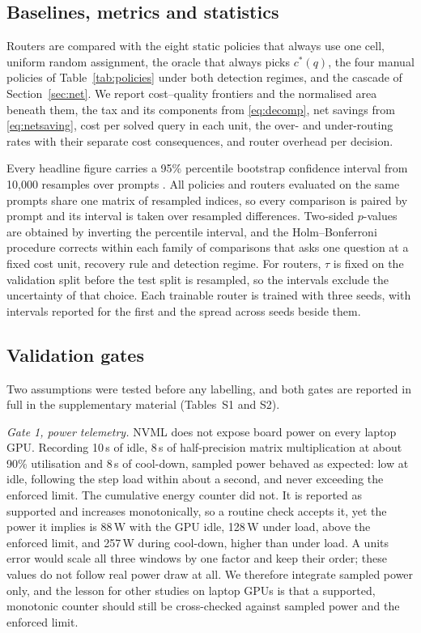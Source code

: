 \documentclass[final,5p,times,twocolumn]{elsarticle}
\theoremstyle{plain}
\newcommand{\cstar}{c^{*}}
\begin{document}
\subsection{Baselines, metrics and statistics}
\label{sec:setup-stats}

Routers are compared with the eight static policies that always use one cell,
uniform random assignment, the oracle that always picks $\cstar(q)$, the four
manual policies of Table~\ref{tab:policies} under both detection regimes, and
the cascade of Section~\ref{sec:net}. We report cost--quality frontiers and
the normalised area beneath them, the tax and its components from
\eqref{eq:decomp}, net savings from \eqref{eq:netsaving}, cost per solved
query in each unit, the over- and under-routing rates with their separate
cost consequences, and router overhead per decision.

Every headline figure carries a 95\% percentile bootstrap confidence interval
from 10{,}000 resamples over prompts \cite{efron1993bootstrap}. All policies
and routers evaluated on the same prompts share one matrix of resampled
indices, so every comparison is paired by prompt and its interval is taken
over resampled differences. Two-sided $p$-values are obtained by inverting
the percentile interval, and the Holm--Bonferroni procedure
\cite{holm1979simple} corrects within each family of comparisons that asks
one question at a fixed cost unit, recovery rule and detection regime. For
routers, $\tau$ is fixed on the validation split before the test split is
resampled, so the intervals exclude the uncertainty of that choice. Each
trainable router is trained with three seeds, with intervals reported for the
first and the spread across seeds beside them.

\subsection{Validation gates}
\label{sec:setup-gates}

Two assumptions were tested before any labelling, and both gates are reported
in full in the supplementary material (Tables~S1 and S2).

\emph{Gate 1, power telemetry.} NVML does not expose board power on every
laptop GPU. Recording 10\,s of idle, 8\,s of half-precision matrix
multiplication at about 90\% utilisation and 8\,s of cool-down, sampled power
behaved as expected: low at idle, following the step load within about a
second, and never exceeding the enforced limit. The cumulative energy counter
did not. It is reported as supported and increases monotonically, so a
routine check accepts it, yet the power it implies is 88\,W with the GPU
idle, 128\,W under load, above the enforced limit, and 257\,W during
cool-down, higher than under load. A units error would scale all three
windows by one factor and keep their order; these values do not follow real
power draw at all. We therefore integrate sampled power only, and the lesson
for other studies on laptop GPUs is that a supported, monotonic counter
should still be cross-checked against sampled power and the enforced limit.
\end{document}
